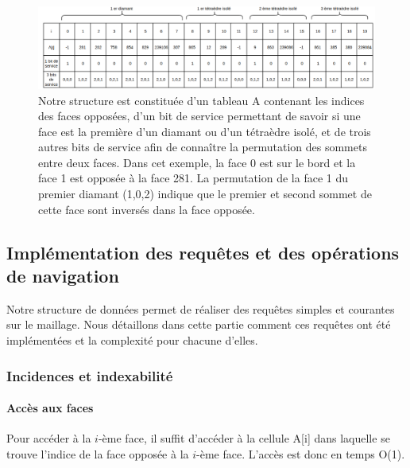 \begin{figure}[H]
\begin{center}
\includegraphics[scale=0.39]{../Images/structure}
\caption{Notre structure est constituée d'un tableau A contenant les indices des faces opposées, d'un bit de service permettant de savoir si une face est la première d'un diamant ou d'un tétraèdre isolé, et de trois autres bits de service afin de connaître la permutation des sommets entre deux faces. Dans cet exemple, la face 0 est sur le bord et la face 1 est opposée à la face 281. La permutation de la face 1 du premier diamant (1,0,2) indique que le premier et second sommet de cette face sont inversés dans la face opposée.}
\label{fig:structure}
\end{center}
\end{figure}


\subsection{Implémentation des requêtes et des opérations de navigation}
\noindent
Notre structure de données permet de réaliser des requêtes simples et courantes sur le maillage. 
Nous détaillons dans cette partie comment ces requêtes ont été implémentées et la complexité pour chacune d'elles.

\subsubsection{Incidences et indexabilité}
\paragraph{Accès aux faces}
\noindent
Pour accéder à la $i$-ème face, il suffit d'accéder à la cellule A[i] dans laquelle se trouve l'indice de la face opposée à la $i$-ème face. L'accès est donc en temps O(1).

